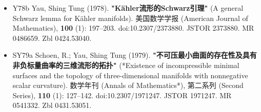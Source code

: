 \begin{itemize}
\item Y78b Yau, Shing Tung (1978). \textbf{"Kähler流形的Schwarz引理"} (A general Schwarz lemma for Kähler manifolds). 美国数学学报 (American Journal of Mathematics), \textbf{100} (1): 197–203. doi:10.2307/2373880. JSTOR 2373880. MR 0486659. Zbl 0424.53040.
\item SY79a  Schoen, R.; Yau, Shing Tung (1979). \textbf{"不可压最小曲面的存在性及具有非负标量曲率的三维流形的拓扑"} (*Existence of incompressible minimal surfaces and the topology of three-dimensional manifolds with nonnegative scalar curvature). 数学年刊 (Annals of Mathematics*), 第二系列 (Second Series), \textbf{110} (1): 127–142. doi:10.2307/1971247. JSTOR 1971247. MR 0541332. Zbl 0431.53051.

\end{itemize}